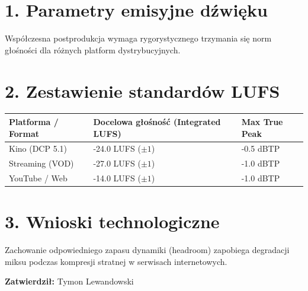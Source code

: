 \section*{1. Parametry emisyjne dźwięku}
Współczesna postprodukcja wymaga rygorystycznego trzymania się norm głośności dla różnych platform dystrybucyjnych.

\section*{2. Zestawienie standardów LUFS}
\begin{tabularx}{\textwidth}{lXX}
\toprule
\textbf{Platforma / Format} & \textbf{Docelowa głośność (Integrated LUFS)} & \textbf{Max True Peak} \\
\midrule
Kino (DCP 5.1) & -24.0 LUFS ($\pm 1$) & -0.5 dBTP \\
Streaming (VOD) & -27.0 LUFS ($\pm 1$) & -1.0 dBTP \\
YouTube / Web & -14.0 LUFS ($\pm 1$) & -1.0 dBTP \\
\bottomrule
\end{tabularx}

\section*{3. Wnioski technologiczne}
Zachowanie odpowiedniego zapasu dynamiki (headroom) zapobiega degradacji miksu podczas kompresji stratnej w serwisach internetowych.

\vspace{1cm}
\noindent\textbf{Zatwierdził:} Tymon Lewandowski